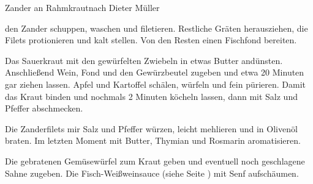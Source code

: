 \begin{recipe}{Zander an Rahmkraut}{nach Dieter Müller}

  
  
  \steps
  den Zander schuppen, waschen und filetieren. Restliche Gräten herausziehen, die Filets
  protionieren und kalt stellen. Von den Resten einen Fischfond bereiten.

  Das Sauerkraut mit den gewürfelten Zwiebeln in etwas Butter andünsten. Anschließend
  Wein, Fond und den Gewürzbeutel zugeben und etwa 20 Minuten gar ziehen lassen. Apfel und
  Kartoffel schälen, würfeln und fein pürieren. Damit das Kraut binden und nochmals 2
  Minuten köcheln lassen, dann mit Salz und Pfeffer abschmecken.

  Die Zanderfilets mir Salz und Pfeffer würzen, leicht mehlieren und in Olivenöl braten.
  Im letzten Moment mit Butter, Thymian und Rosmarin aromatisieren.

  Die gebratenen Gemüsewürfel zum Kraut geben und eventuell noch geschlagene Sahne
  zugeben. Die Fisch-Weißweinsauce (siehe Seite \pageref{Fischsauce}) mit Senf aufschäumen.
\end{recipe}
